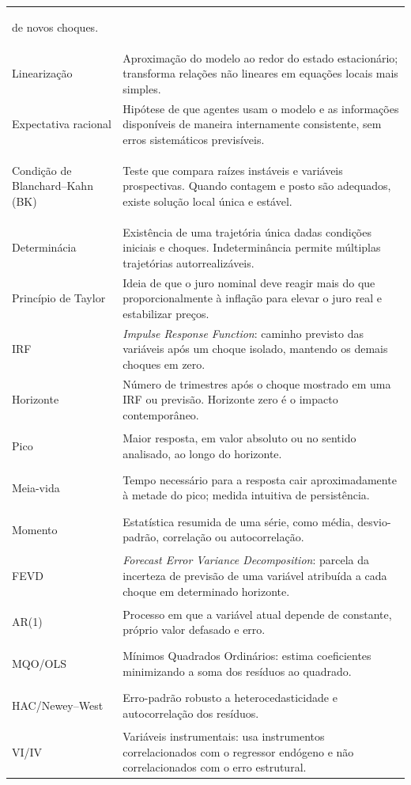 \documentclass[11pt,a4paper]{article}
\begin{document}
\begin{longtable}{>{\bfseries\raggedright\arraybackslash}p{}>{\raggedright\arraybackslash}p{}}
de novos choques. \\
Linearização & Aproximação do modelo ao redor do estado estacionário; transforma relações não
lineares em equações locais mais simples. \\
Expectativa racional & Hipótese de que agentes usam o modelo e as informações disponíveis de
maneira internamente consistente, sem erros sistemáticos previsíveis. \\
Condição de Blanchard--Kahn (BK) & Teste que compara raízes instáveis e variáveis prospectivas.
Quando contagem e posto são adequados, existe solução local única e estável. \\
Determinácia & Existência de uma trajetória única dadas condições iniciais e choques.
Indeterminância permite múltiplas trajetórias autorrealizáveis. \\
Princípio de Taylor & Ideia de que o juro nominal deve reagir mais do que proporcionalmente à
inflação para elevar o juro real e estabilizar preços. \\
IRF & \textit{Impulse Response Function}: caminho previsto das variáveis após um choque isolado,
mantendo os demais choques em zero. \\
Horizonte & Número de trimestres após o choque mostrado em uma IRF ou previsão. Horizonte zero é
o impacto contemporâneo. \\
Pico & Maior resposta, em valor absoluto ou no sentido analisado, ao longo do horizonte. \\
Meia-vida & Tempo necessário para a resposta cair aproximadamente à metade do pico; medida
intuitiva de persistência. \\
Momento & Estatística resumida de uma série, como média, desvio-padrão, correlação ou
autocorrelação. \\
FEVD & \textit{Forecast Error Variance Decomposition}: parcela da incerteza de previsão de uma
variável atribuída a cada choque em determinado horizonte. \\
AR(1) & Processo em que a variável atual depende de constante, próprio valor defasado e erro. \\
MQO/OLS & Mínimos Quadrados Ordinários: estima coeficientes minimizando a soma dos resíduos ao
quadrado. \\
HAC/Newey--West & Erro-padrão robusto a heterocedasticidade e autocorrelação dos resíduos. \\
VI/IV & Variáveis instrumentais: usa instrumentos correlacionados com o regressor endógeno e não
correlacionados com o erro estrutural. \\

\end{longtable}
\end{document}
